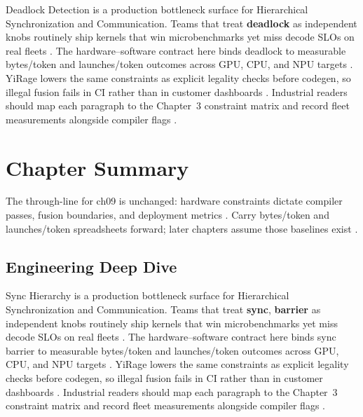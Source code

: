 Deadlock Detection is a production bottleneck surface for Hierarchical Synchronization and Communication. Teams that treat \textbf{deadlock} as independent knobs routinely ship kernels that win microbenchmarks yet miss decode SLOs on real fleets \citep{nvidia2022hopper,amd2024aie}. The hardware--software contract here binds deadlock to measurable bytes/token and launches/token outcomes across GPU, CPU, and NPU targets \citep{semianalysis2024tma,dlbook}. YiRage lowers the same constraints as explicit legality checks before codegen, so illegal fusion fails in CI rather than in customer dashboards \citep{amd2024xdna,dao2022flashattention}. Industrial readers should map each paragraph to the Chapter~3 constraint matrix and record fleet measurements alongside compiler flags \citep{amd2024aie,kwon2023vllm}.

\section{Chapter Summary}
\label{sec:ch09_summary}

The through-line for ch09 is unchanged: hardware constraints dictate compiler passes, fusion boundaries, and deployment metrics \citep{memoryfloor2026,amd2024xdna}. Carry bytes/token and launches/token spreadsheets forward; later chapters assume those baselines exist \citep{semianalysis2024tma,dlbook}.


\subsection{Engineering Deep Dive}
\label{sec:ch09_deep_dive}

Sync Hierarchy is a production bottleneck surface for Hierarchical Synchronization and Communication. Teams that treat \textbf{sync}, \textbf{barrier} as independent knobs routinely ship kernels that win microbenchmarks yet miss decode SLOs on real fleets \citep{semianalysis2024tma,dlbook}. The hardware--software contract here binds sync barrier to measurable bytes/token and launches/token outcomes across GPU, CPU, and NPU targets \citep{amd2024xdna,dao2022flashattention}. YiRage lowers the same constraints as explicit legality checks before codegen, so illegal fusion fails in CI rather than in customer dashboards \citep{amd2024aie,kwon2023vllm}. Industrial readers should map each paragraph to the Chapter~3 constraint matrix and record fleet measurements alongside compiler flags \citep{dlbook,nvidia2024cudagraphs}.

